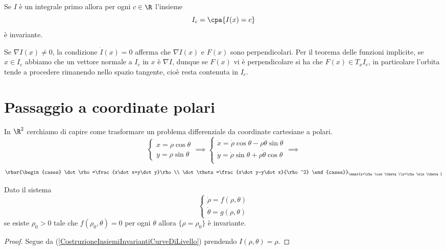 \begin{corollary}\label{InvarianzaInsiemiLivelloIntegraliPrimi}
Se $I$ \`e un integrale primo allora per ogni $c\in\R$ l'insieme
\[I_c=\cpa{I(x)=c}\]
\`e invariante.
\end{corollary}


\begin{remark}
Se $\nabla I(x)\neq 0$, la condizione $\dot I(x)=0$ afferma che $\nabla I(x)$ e $F(x)$ sono perpendicolari. Per il teorema delle funzioni implicite, se $x\in I_c$ abbiamo che un vettore normale a $I_c$ in $x$ \`e $\nabla I$, dunque se $F(x)$ vi \`e perpendicolare si ha che $F(x)\in T_x I_c$, in particolare l'orbita tende a procedere rimanendo nello spazio tangente, cio\`e resta contenuta in $I_c$.
\end{remark}

\section{Passaggio a coordinate polari}
In $\R^2$ cerchiamo di capire come trasformare un problema differenziale da coordinate cartesiane a polari.
\[\begin{cases}
x=\rho\cos\theta\\
y=\rho\sin\theta
\end{cases}\implies 
\begin{cases}
\dot x=\dot\rho\cos\theta-\rho\dot\theta\sin\theta\\
\dot y=\dot\rho\sin\theta+\rho\dot\theta\cos\theta\\
\end{cases}\implies\]
\[\rbar{\begin{cases}
\dot \rho=\frac{x\dot x+y\dot y}\rho\\
\dot\theta=\frac{x\dot y-y\dot x}{\rho^2}
\end{cases}}_{\smat{x=\rho\cos\theta\\y=\rho\sin\theta}}\]


\begin{proposition}
Dato il sistema
\[\begin{cases}
\dot \rho=f(\rho,\theta)\\
\dot \theta=g(\rho,\theta)
\end{cases}\]
se esiste $\rho_0>0$ tale che $f(\rho_0,\theta)=0$ per ogni $\theta$ allora $\{\rho=\rho_0\}$ \`e invariante.
\end{proposition}
\begin{proof}
Segue da (\ref{CostruzioneInsiemiInvariantiCurveDiLivello}) prendendo $I(\rho,\theta)=\rho$.
\end{proof}

